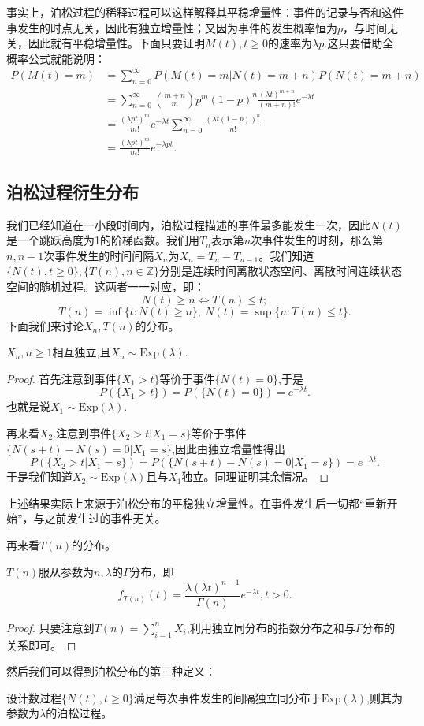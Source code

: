 \documentclass[lang=cn,10pt]{elegantbook}
\begin{document}
	事实上，泊松过程的稀释过程可以这样解释其平稳增量性：事件的记录与否和这件事发生的时点无关，因此有独立增量性；又因为事件的发生概率恒为\(p\)，与时间无关，因此就有平稳增量性。下面只要证明\(M(t),t\ge 0\)的速率为\(\lambda p\).这只要借助全概率公式就能说明：
	\begin{align*}
		P(M(t)=m)&=\sum_{n=0}^{\infty}P(M(t)=m|N(t)=m+n)P(N(t)=m+n)\\
		&=\sum_{n=0}^{\infty}\binom{m+n}{m}p^m(1-p)^n\frac{(\lambda t)^{m+n}}{(m+n)!}e^{-\lambda t}\\
		&=\frac{(\lambda pt)^m}{m!}e^{-\lambda t}\sum_{n=0}^{\infty}\frac{(\lambda t(1-p))^n}{n!}\\
		&=\frac{(\lambda pt)^m}{m!}e^{-\lambda pt}.
	\end{align*}
	\subsection{泊松过程衍生分布}
	我们已经知道在一小段时间内，泊松过程描述的事件最多能发生一次，因此\(N(t)\)是一个跳跃高度为1的阶梯函数。我们用\(T_n\)表示第\(n\)次事件发生的时刻，那么第\(n,n-1\)次事件发生的时间间隔\(X_n\)为\(X_n=T_n-T_{n-1}\)。我们知道\(\{N(t),t\ge 0
\},\{T(n),n\in \mathbb{Z}\}\)分别是连续时间离散状态空间、离散时间连续状态空间的随机过程。这两者一一对应，即：
	\[N(t)\ge n \Leftrightarrow T(n)\le t;\]
	\[T(n)=\inf\{t:N(t)\ge n\},\ N(t)=\sup\{n:T(n)\le t\}.\]
	下面我们来讨论\(X_n,T(n)\)的分布。
	\begin{theorem}
		\(X_n,n\ge 1\)相互独立,且\(X_n\sim \text{Exp}(\lambda)\).
	\end{theorem}
	\begin{proof}
		首先注意到事件\(\{X_1>t\}\)等价于事件\(\{N(t)=0\}\),于是
		\[P(\{X_1>t\})=P(\{N(t)=0\})=e^{-\lambda t}.\]
		也就是说\(X_1\sim \text{Exp}(\lambda)\).

		再来看\(X_2\).注意到事件\(\{X_2>t|X_1=s\}\)等价于事件\(\{N(s+t)-N(s)=0|X_1=s\}\),因此由独立增量性得出
		\[P(\{X_2>t|X_1=s\})=P(\{N(s+t)-N(s)=0|X_1=s\})=e^{-\lambda t}.\]
		于是我们知道\(X_2\sim \text{Exp}(\lambda)\)且与\(X_1\)独立。同理证明其余情况。
	\end{proof}
	\begin{note}
		上述结果实际上来源于泊松分布的平稳独立增量性。在事件发生后一切都“重新开始”，与之前发生过的事件无关。
	\end{note}
	再来看\(T(n)\)的分布。
	\begin{theorem}
		\(T(n)\)服从参数为\(n,\lambda\)的\(\Gamma\)分布，即
		\[f_{T(n)}(t)=\frac{\lambda(\lambda t)^{n-1}}{\Gamma(n)}e^{-\lambda t},t>0.\]
	\end{theorem}
	\begin{proof}
		只要注意到\(T(n)=\sum_{i=1}^{n}X_i\),利用独立同分布的指数分布之和与\(\Gamma\)分布的关系即可。
	\end{proof}
	然后我们可以得到泊松分布的第三种定义：
	\begin{definition}[泊松过程3]
		设计数过程\(\{N(t),t\ge 0\}\)满足每次事件发生的间隔独立同分布于\(\text{Exp}(\lambda)\),则其为参数为\(\lambda\)的泊松过程。
	\end{definition}
\end{document}
